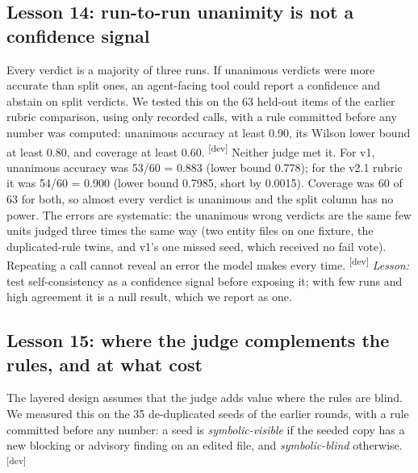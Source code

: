 \documentclass[10pt,a4paper]{article}
\newcommand{\devset}{\textsuperscript{\textsf{\tiny[dev]}}}
\begin{document}
\subsection{Lesson 14: run-to-run unanimity is not a confidence signal}\label{sec:l14}

Every verdict is a majority of three runs. If unanimous verdicts were more accurate than split ones, an agent-facing
tool could report a confidence and abstain on split verdicts. We tested this on the 63 held-out items of the earlier
rubric comparison, using only recorded calls, with a rule committed before any number was computed: unanimous
accuracy at least 0.90, its Wilson lower bound at least 0.80, and coverage at least 0.60. \devset{}
Neither judge met it. For v1, unanimous accuracy was 53/60 = 0.883 (lower bound 0.778); for the v2.1 rubric it was
54/60 = 0.900 (lower bound 0.7985, short by 0.0015). Coverage was 60 of 63 for both, so almost every verdict is
unanimous and the split column has no power. The errors are systematic: the unanimous wrong verdicts are the same few
units judged three times the same way (two entity files on one fixture, the duplicated-rule twins, and v1's one missed
seed, which received no fail vote). Repeating a call cannot reveal an error the model makes every time. \devset{}
\emph{Lesson:} test self-consistency as a confidence signal before exposing it; with few runs and high agreement it is
a null result, which we report as one.

\subsection{Lesson 15: where the judge complements the rules, and at what cost}\label{sec:l15}

The layered design assumes that the judge adds value where the rules are blind. We measured this on the 35
de-duplicated seeds of the earlier rounds, with a rule committed before any number: a seed is \emph{symbolic-visible}
if the seeded copy has a new blocking or advisory finding on an edited file, and \emph{symbolic-blind} otherwise.
\devset{}
\end{document}
